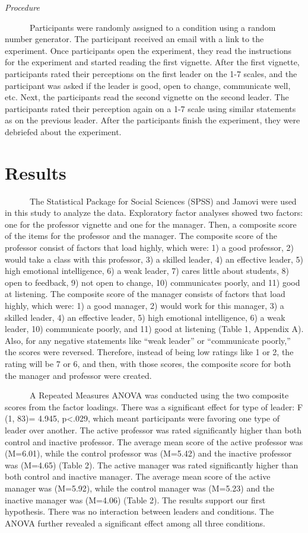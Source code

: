 \documentclass[
  12pt,
]{article}
\begin{document}
\emph{Procedure}

~~~~~~Participants were randomly assigned to a condition using a random number generator. The participant received an email with a link to the experiment. Once participants open the experiment, they read the instructions for the experiment and started reading the first vignette. After the first vignette, participants rated their perceptions on the first leader on the 1-7 scales, and the participant was asked if the leader is good, open to change, communicate well, etc. Next, the participants read the second vignette on the second leader. The participants rated their perception again on a 1-7 scale using similar statements as on the previous leader. After the participants finish the experiment, they were debriefed about the experiment.

\hypertarget{results}{%
\section{Results}\label{results}}

~~~~~~The Statistical Package for Social Sciences (SPSS) and Jamovi were used in this study to analyze the data. Exploratory factor analyses showed two factors: one for the professor vignette and one for the manager. Then, a composite score of the items for the professor and the manager. The composite score of the professor consist of factors that load highly, which were: 1) a good professor, 2) would take a class with this professor, 3) a skilled leader, 4) an effective leader, 5) high emotional intelligence, 6) a weak leader, 7) cares little about students, 8) open to feedback, 9) not open to change, 10) communicates poorly, and 11) good at listening. The composite score of the manager consists of factors that load highly, which were: 1) a good manager, 2) would work for this manager, 3) a skilled leader, 4) an effective leader, 5) high emotional intelligence, 6) a weak leader, 10) communicate poorly, and 11) good at listening (Table 1, Appendix A). Also, for any negative statements like ``weak leader'' or ``communicate poorly,'' the scores were reversed. Therefore, instead of being low ratings like 1 or 2, the rating will be 7 or 6, and then, with those scores, the composite score for both the manager and professor were created.

~~~~~~A Repeated Measures ANOVA was conducted using the two composite scores from the factor loadings. There was a significant effect for type of leader: F (1, 83)= 4.945, p\textless.029, which meant participants were favoring one type of leader over another. The active professor was rated significantly higher than both control and inactive professor. The average mean score of the active professor was (M=6.01), while the control professor was (M=5.42) and the inactive professor was (M=4.65) (Table 2). The active manager was rated significantly higher than both control and inactive manager. The average mean score of the active manager was (M=5.92), while the control manager was (M=5.23) and the inactive manager was (M=4.06) (Table 2). The results support our first hypothesis. There was no interaction between leaders and conditions. The ANOVA further revealed a significant effect among all three conditions.
\end{document}
